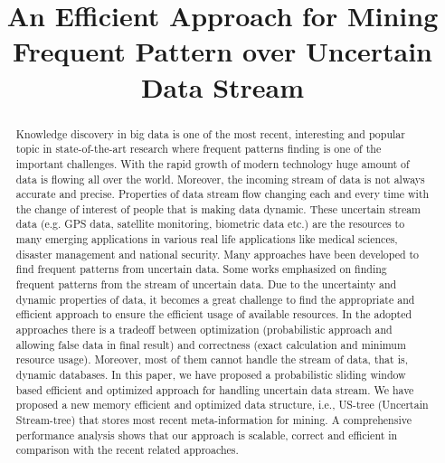 \documentclass[conference]{IEEEtran}
\begin{document}
\title{An Efficient Approach for Mining Frequent Pattern over Uncertain Data Stream}

\author{
}

\maketitle

\begin{abstract}
Knowledge discovery in big data is one of the most recent, interesting and popular topic in state-of-the-art research where frequent patterns finding is one of the important challenges. With the rapid growth of modern technology huge amount of data is flowing all over the world. Moreover, the incoming stream of data is not always accurate and precise. Properties of data stream flow changing each and every time with the change of interest of people that is making data dynamic.  These uncertain stream data (e.g. GPS data, satellite monitoring, biometric data etc.) are the resources to many emerging applications in various real life applications like medical sciences, disaster management and national security. Many approaches have been developed to find frequent patterns from uncertain data. Some works emphasized on finding frequent patterns from the stream of uncertain data. Due to the uncertainty and dynamic properties of data, it becomes a great challenge to find the appropriate and efficient approach to ensure the efficient usage of available resources. In the adopted approaches there is a tradeoff between optimization (probabilistic approach and allowing false data in final result) and correctness (exact calculation and minimum resource usage). Moreover, most of them cannot handle the stream of data, that is, dynamic databases. In this paper, we have proposed a probabilistic sliding window based efficient and optimized approach for handling uncertain data stream. We have proposed a new memory efficient and optimized data structure, i.e., US-tree (Uncertain Stream-tree) that stores most recent meta-information for mining. A comprehensive performance analysis shows that our approach is scalable, correct and efficient in comparison with the recent related approaches.
\end{abstract}
\end{document}
